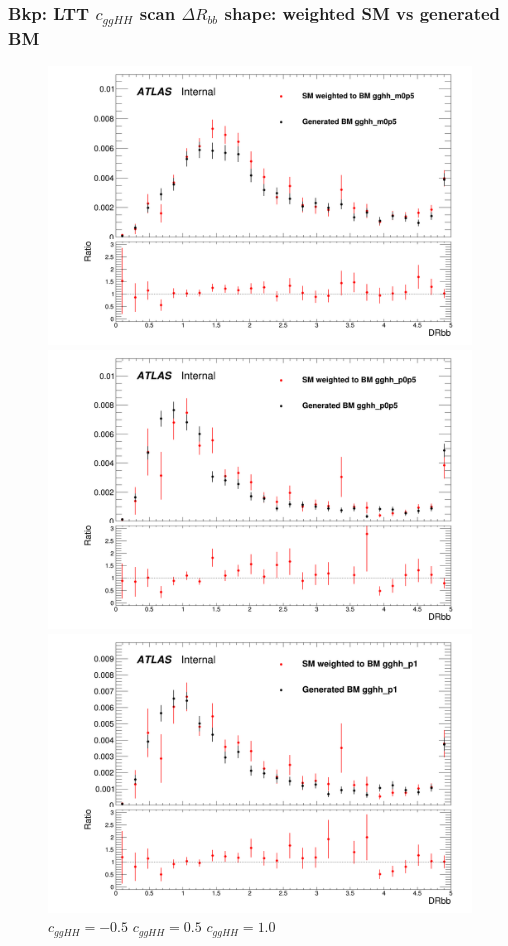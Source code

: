 \documentclass[twoside,11pt]{beamer}
\begin{document}
\begin{frame}
\frametitle{Bkp: LTT $c_{ggHH}$ scan $\Delta R_{bb}$ shape: weighted SM vs generated BM}

\begin{figure}
\includegraphics[width=.32\textwidth]{figures/Method_B_all_latest_LTT/BMgghh_m0p5h_DRbb.png}
\includegraphics[width=.32\textwidth]{figures/Method_B_all_latest_LTT/BMgghh_p0p5h_DRbb.png}
\includegraphics[width=.32\textwidth]{figures/Method_B_all_latest_LTT/BMgghh_p1h_DRbb.png}
$c_{ggHH} = -0.5$ \hspace{5em} $c_{ggHH} = 0.5$\hspace{5em} $c_{ggHH} = 1.0$
\end{figure}


\end{frame}     
\end{document}
